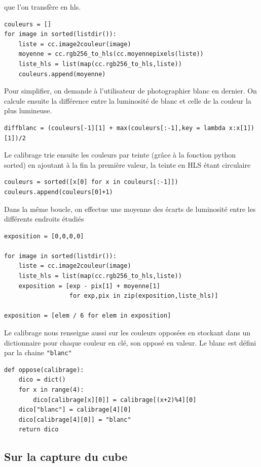 \documentclass[11pt,a4paper]{article}
\begin{document}
que l'on transfère en hls.
\begin{lstlisting}
couleurs = []
for image in sorted(listdir()):
    liste = cc.image2couleur(image)
    moyenne = cc.rgb256_to_hls(cc.moyennepixels(liste))
    liste_hls = list(map(cc.rgb256_to_hls,liste))
    couleurs.append(moyenne)
\end{lstlisting}
Pour simplifier, on demande à l'utilisateur de photographier blanc en dernier.
On calcule ensuite la différence entre la luminosité de blanc et celle de la couleur la plus lumineuse.
\begin{lstlisting}
diffblanc = (couleurs[-1][1] + max(couleurs[:-1],key = lambda x:x[1])[1])/2
\end{lstlisting}

Le calibrage trie ensuite les couleurs par teinte (grâce à la fonction python sorted) en ajoutant à la fin la première valeur, la teinte en HLS étant circulaire
\begin{lstlisting}
couleurs = sorted([x[0] for x in couleurs[:-1]])
couleurs.append(couleurs[0]+1)
\end{lstlisting}
Dans la même boucle, on effectue une moyenne des écarts de luminosité entre les différents endroits étudiés

\begin{lstlisting}
exposition = [0,0,0,0]

for image in sorted(listdir()):
    liste = cc.image2couleur(image)
    liste_hls = list(map(cc.rgb256_to_hls,liste))
    exposition = [exp - pix[1] + moyenne[1]
                  for exp,pix in zip(exposition,liste_hls)]

exposition = [elem / 6 for elem in exposition]

\end{lstlisting}

Le calibrage nous renseigne aussi sur les couleurs opposées en stockant dans un dictionnaire pour chaque couleur en clé, son opposé en valeur.
Le blanc est défini par la chaine \texttt{"blanc"}
\begin{lstlisting}
def oppose(calibrage):
    dico = dict()
    for x in range(4):
        dico[calibrage[x][0]] = calibrage[(x+2)%4][0]
    dico["blanc"] = calibrage[4][0]
    dico[calibrage[4][0]] = "blanc"
    return dico
\end{lstlisting}

	\subsection{Sur la capture du cube}
	
\end{document}
